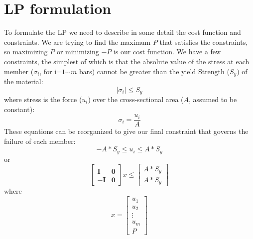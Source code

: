 \documentclass[12pt]{article}
\newcommand{\bm}[1]{\boldsymbol{#1}}
\begin{document}
\section{LP formulation}
To formulate the LP we need to describe in some detail the cost function and constraints.  We are trying to find the maximum $P$ that satisfies the constraints, so maximizing $P$ or minimizing $-P$ is our cost function.  We have a few constraints, the simplest of which is that the absolute value of the stress at each member ($\sigma_i$, for i=$1\cdots m$ bars) cannot be greater than the yield Strength ($S_y$) of the material:
\begin{equation}
|\sigma_i| \leq S_y
\end{equation}
where stress is the force ($u_i$) over the cross-sectional area ($A$, assumed to be constant):
\begin{equation}
\sigma_i = \frac{u_i}{A}
\end{equation}
These equations can be reorganized to give our final constraint that governs the failure of each member:
\begin{equation}
 -A*S_y \leq u_i \leq A*S_y
\end{equation}
or 
\begin{equation}
\left[
\begin{array}{rr}
\bm{I} & \bm{0}\\
-\bm{I} & \bm{0}
\end{array}
\right]
x \leq 
\left[
\begin{array}{c}
A*S_y\\
A*S_y
\end{array}
\right]
\end{equation}
where
\begin{equation}
x = \left[
\begin{array}{c}
u_1\\
u_2\\
\vdots\\
u_m\\
P
\end{array}
\right]
\end{equation}
\end{document}

